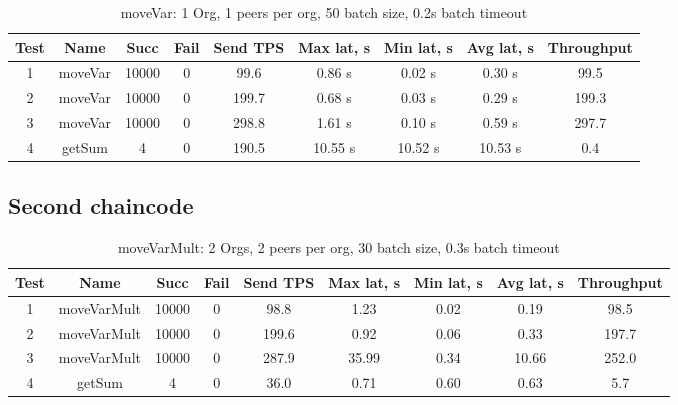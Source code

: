 \begin{appendices}
\begin{table}[h!]
\begin{center}
\begin{tabular}{ |c|c|c|c|c|c|c|c|c| }
 \hline
  Test & Name & Succ  & Fail & Send TPS & Max lat, s & Min lat, s & Avg lat, s & Throughput \\
 \hline
 \hline
 1 & moveVar  & 10000  & 0 & 99.6 & 0.86 s & 0.02 s & 0.30 s & 99.5  \\
  \hline
 2 & moveVar  & 10000  & 0 & 199.7  & 0.68 s & 0.03 s & 0.29 s & 199.3 \\
  \hline
 3 & moveVar  & 10000  & 0 & 298.8  & 1.61 s & 0.10 s & 0.59 s & 297.7 \\
  \hline
 4 & getSum  & 4  & 0  & 190.5  & 10.55 s  & 10.52 s  & 10.53 s  & 0.4 \\
 \hline
\end{tabular}
\end{center}
\caption{moveVar: 1 Org, 1 peers per org, 50 batch size, 0.2s batch timeout}
\end{table}

\newpage
\subsection{Second chaincode} \label{apdx:snd}

\begin{table}[h!]
\begin{center}
\begin{tabular}{ |c|c|c|c|c|c|c|c|c| }
 \hline
  Test & Name & Succ  & Fail & Send TPS & Max lat, s & Min lat, s & Avg lat, s & Throughput \\
 \hline
 \hline
 1    & moveVarMult & 10000 & 0    & 98.8  & 1.23      & 0.02      & 0.19      & 98.5   \\
 \hline
 2    & moveVarMult & 10000 & 0    & 199.6 & 0.92      & 0.06      & 0.33      & 197.7  \\
 \hline
 3    & moveVarMult & 10000 & 0    & 287.9 & 35.99     & 0.34      & 10.66     & 252.0  \\
 \hline
 4    & getSum      & 4     & 0    & 36.0  & 0.71      & 0.60      & 0.63      & 5.7    \\
 \hline
\end{tabular}
\end{center}
\caption{moveVarMult: 2 Orgs, 2 peers per org, 30 batch size, 0.3s batch timeout}
\end{table}


\end{appendices}
